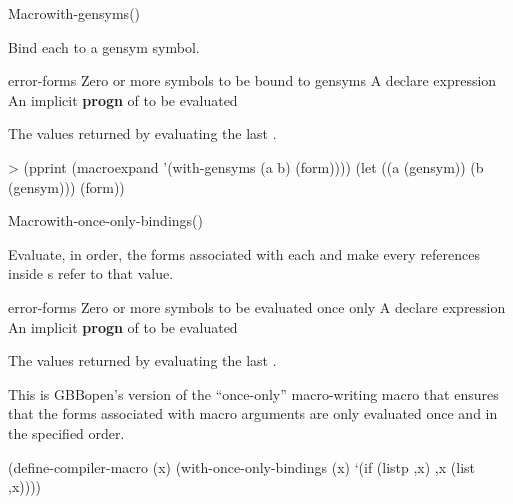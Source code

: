 \documentclass[10pt,twoside,english,pdftex]{article}
\begin{document}
\begin{functiondoc}{Macro}{with-gensyms}{(\superstar{})
    \superstar{}
    \superstar{} \returns{}
    \superstar{}}
\fnsyntax

\fnpurpose Bind each  to a gensym symbol.

\fnpackage {}

\fnmodule {}

\fnargs
\begin{args}{error-forms}
\arg[symbols] Zero or more symbols to be bound to gensyms
\arg[declaration] A declare expression
\arg[forms] An implicit \textbf{progn} of  to be evaluated
\end{args}

\fnreturns The values returned by evaluating the last .

\fnexamples
\begin{example}
> (pprint (macroexpand '(with-gensyms (a b) (form))))
(let ((a (gensym))
      (b (gensym)))
  (form))
\end{example}

\end{functiondoc}


\begin{functiondoc}{Macro}{with-once-only-bindings}{(\superstar{})
    \superstar{}
    \superstar{} \returns{}
    \superstar{}}

\fnsyntax

\fnpurpose Evaluate, in order, the forms associated with each 
and make every  references inside s refer to that
value.

\fnpackage {}

\fnmodule {}

\fnargs
\begin{args}{error-forms}
\arg[symbols] Zero or more symbols to be evaluated once only
\arg[declaration] A declare expression
\arg[forms] An implicit \textbf{progn} of  to be evaluated
\end{args}

\fnreturns The values returned by evaluating the last .

\fndescription This is GBBopen's version of the ``once-only'' macro-writing
macro that ensures that the forms associated with macro arguments are
only evaluated once and in the specified order.

%
\fnexample
\begin{example}
  (define-compiler-macro  (x)
    (with-once-only-bindings (x)
      `(if (listp ,x) ,x (list ,x))))
\end{example}

\end{functiondoc}
\end{document}
